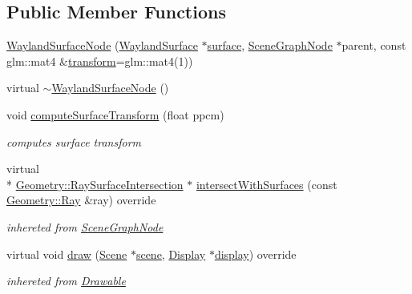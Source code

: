 \subsection*{Public Member Functions}
\begin{DoxyCompactItemize}
\item 
\hyperlink{classmotorcar_1_1WaylandSurfaceNode_ad7d045ae80caac6164e293ba5c7e9307}{Wayland\-Surface\-Node} (\hyperlink{classmotorcar_1_1WaylandSurface}{Wayland\-Surface} $\ast$\hyperlink{simple-egl_8c_a0720952aa1caded45b5bcdce589663a9}{surface}, \hyperlink{classmotorcar_1_1SceneGraphNode}{Scene\-Graph\-Node} $\ast$parent, const glm\-::mat4 \&\hyperlink{classmotorcar_1_1SceneGraphNode_ad96e79fdd739ac8223a3128003be391a}{transform}=glm\-::mat4(1))
\item 
virtual \hyperlink{classmotorcar_1_1WaylandSurfaceNode_aa5b4593dd0f4834a4d8e1416f322ac8f}{$\sim$\-Wayland\-Surface\-Node} ()
\item 
void \hyperlink{classmotorcar_1_1WaylandSurfaceNode_a0dfac06ca2855e41613b6e663c76c97e}{compute\-Surface\-Transform} (float ppcm)
\begin{DoxyCompactList}\small\item\em computes surface transform \end{DoxyCompactList}\item 
virtual \\*
\hyperlink{structmotorcar_1_1Geometry_1_1RaySurfaceIntersection}{Geometry\-::\-Ray\-Surface\-Intersection} $\ast$ \hyperlink{classmotorcar_1_1WaylandSurfaceNode_adf71a714d07bb262405a361504a77ea4}{intersect\-With\-Surfaces} (const \hyperlink{structmotorcar_1_1Geometry_1_1Ray}{Geometry\-::\-Ray} \&ray) override
\begin{DoxyCompactList}\small\item\em inhereted from \hyperlink{classmotorcar_1_1SceneGraphNode}{Scene\-Graph\-Node} \end{DoxyCompactList}\item 
virtual void \hyperlink{classmotorcar_1_1WaylandSurfaceNode_a1afe3178777574dd1b3c66d7d19d871b}{draw} (\hyperlink{classmotorcar_1_1Scene}{Scene} $\ast$\hyperlink{classmotorcar_1_1SceneGraphNode_aa14e637ed4ae98f77e28941a4b5cfdd8}{scene}, \hyperlink{classmotorcar_1_1Display}{Display} $\ast$\hyperlink{structdisplay}{display}) override
\begin{DoxyCompactList}\small\item\em inhereted from \hyperlink{classmotorcar_1_1Drawable}{Drawable} \end{DoxyCompactList}\item 

\end{DoxyCompactItemize}
